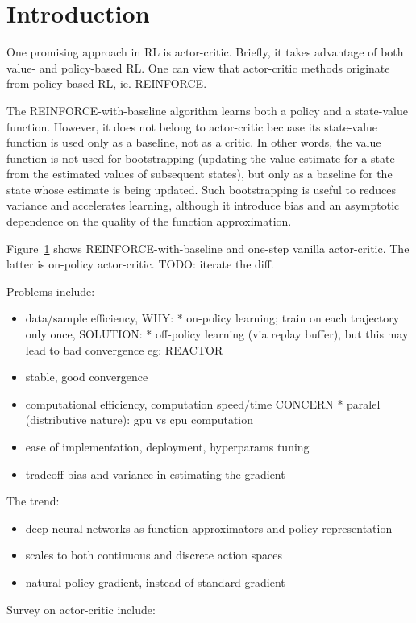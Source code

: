 \section{Introduction}

One promising approach in RL is actor-critic.
Briefly, it takes advantage of both value- and policy-based RL.
One can view that actor-critic methods originate from policy-based RL, ie. REINFORCE.

The REINFORCE-with-baseline algorithm learns both a policy and a state-value function.
However, it does not belong to actor-critic becuase
its state-value function is used only as a baseline, not as a critic.
In other words, the value function is not used for bootstrapping
(updating the value estimate for a state from the estimated values of subsequent states),
but only as a baseline for the state whose estimate is being updated.
Such bootstrapping is useful to reduces variance and accelerates learning,
although it introduce bias and an asymptotic dependence on
the quality of the function approximation.

Figure~\ref{} shows REINFORCE-with-baseline and one-step vanilla actor-critic.
The latter is on-policy actor-critic.
TODO: iterate the diff.

Problems include:
\begin{itemize}
\item data/sample efficiency,
    WHY:
    * on-policy learning; train on each trajectory only once,
    SOLUTION:
    * off-policy learning (via replay buffer),
      but this may lead to bad convergence
      eg: REACTOR~\cite{Gruslys2018}
\item stable, good convergence
\item computational efficiency, computation speed/time
    CONCERN
    * paralel (distributive nature): gpu vs cpu computation

\item ease of implementation, deployment, hyperparams tuning
\item tradeoff bias and variance in estimating the gradient
\end{itemize}

The trend:
\begin{itemize}
\item deep neural networks as
      function approximators and policy representation
\item scales to both continuous and discrete action spaces
\item natural policy gradient, instead of standard gradient
\end{itemize}

Survey on actor-critic include:
\cite{6392457}


